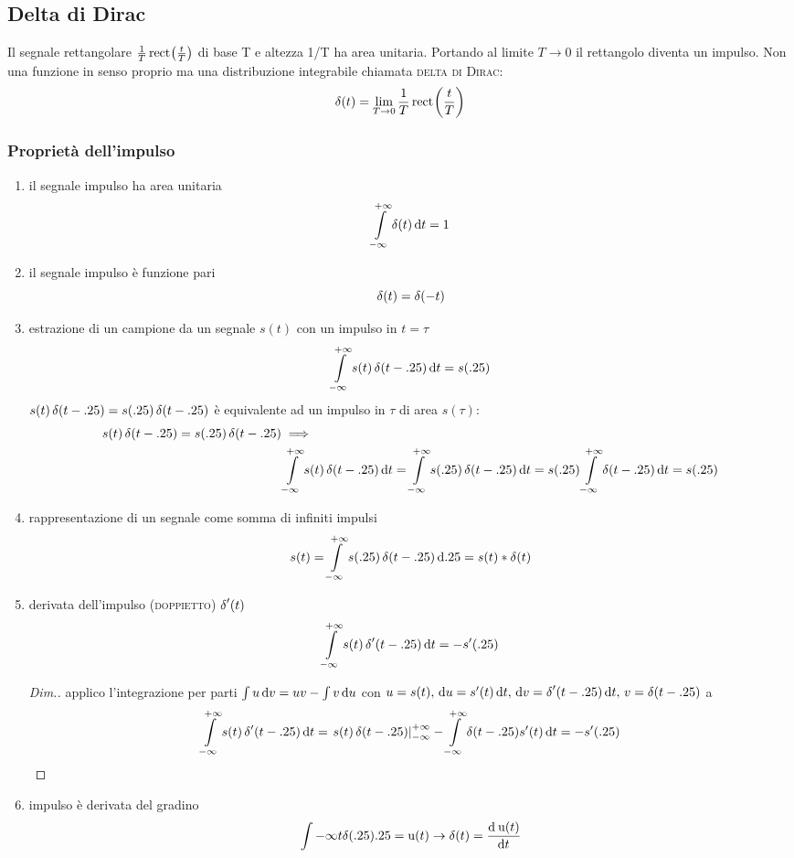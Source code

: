 \subsection{Delta di Dirac}
Il segnale rettangolare $\frac{1}{T} \rect{\frac{t}{T}}$ di base T e altezza 1/T ha area unitaria. Portando al limite $T\to 0$ il rettangolo diventa un impulso. Non una funzione in senso proprio ma una distribuzione integrabile chiamata \textsc{delta di Dirac}: \[\delta(t)=\lim\limits_{T\to 0}\frac{1}{T}\rect{\frac{t}{T}}\]

\subsubsection{Proprietà dell'impulso}
\begin{enumerate}
\item il segnale impulso ha area unitaria \[ \intinf{\impulse(t)}{t}=1 \]
\item il segnale impulso è funzione pari \[ \impulse(t)=\impulse(-t) \]
\item estrazione di un campione da un segnale $s(t)$ con un impulso in $t=\tau$ \[ \intinf{s(t)\impulse(t-\tau)}{t}=s(\tau) \]
$s(t)\impulse(t-\tau)=s(\tau)\impulse(t-\tau)$ è equivalente ad un impulso in $\tau$ di area $s(\tau)$:
\begin{align*}
 s(t)\impulse(t-\tau)=s(\tau)\impulse(t-\tau) &\implies \\ & \intinf{s(t)\impulse(t-\tau)}{t} =\intinf{s(\tau)\impulse(t-\tau)}{t} = s(\tau)\intinf{\impulse(t-\tau)}{t} = s(\tau)
 \end{align*}

\item rappresentazione di un segnale come somma di infiniti impulsi
\[s(t)=\intinf{s(\tau)\impulse(t-\tau)}{\tau}=s(t)\ast\impulse(t)\]
\item derivata dell'impulso (\textsc{doppietto}) $\impulse'(t)$
\[ \intinf{s(t)\impulse'(t-\tau)}{t}=-s'(\tau) \]
\begin{proof}[Dim.]
applico l'integrazione per parti $\int{u \diff v}=u v-\int{v\diff u}$ con $u=s(t) ,\, \diff u=s'(t)\diff t ,\, \diff v=\impulse'(t-\tau)\diff t ,\, v=\impulse(t-\tau)$  a
\[\intinf{s(t)\impulse'(t-\tau)}{t}= \restrict{s(t)\impulse(t-\tau)}{-\infty}^{+\infty} -\intinf{\impulse(t-\tau)s'(t)}{t}=-s'(\tau)  \]
\end{proof}
\item impulso è derivata del gradino
\[\int{-\infty}{t}{\impulse(\tau)}{\tau}=\step(t)  \to \impulse(t)=\deriv{\step(t)}{t} \]

\end{enumerate}

